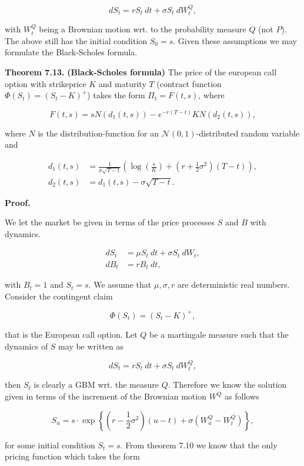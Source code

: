 \documentclass[
]{article}
\begin{document}
\[
dS_t=r S_t\ dt+\sigma S_t\ dW^Q_t,
\]

with \(W_t^Q\) being a Brownian motion wrt. to the probability measure
\(Q\) (not \(P\)). The above still has the initial condition \(S_0=s\).
Given these assumptions we may formulate the Black-Scholes formula.

\textbf{Theorem 7.13.} \textbf{(Black-Scholes formula)} The price of the
european call option with strikeprice \(K\) and maturity \(T\) (contract
function \(\Phi(S_t)=\left( S_t - K\right)^+\)) takes the form
\(\Pi_t=F(t,s)\), where

\[
F(t,s)=s N(d_1(t,s))-e^{-r(T-t)}KN(d_2(t,s)),\tag{7.52}
\]

where \(N\) is the distribution-function for an
\(\mathcal{N}(0,1)\)-distributed random variable and

\begin{align*}
d_1(t,s)&=\frac{1}{\sigma \sqrt{T-t}}\left(\log\left(\frac{s}{K}\right)+\left(r+\frac{1}{2}\sigma^2\right)(T-t)\right),\tag{7.53}\\
d_2(t,s)&=d_1(t,s)-\sigma\sqrt{T-t}.\tag{7.54}
\end{align*}

\textbf{Proof.}

We let the market be given in terms of the price processes \(S\) and
\(B\) with dynamics.

\begin{align*}
dS_t&=\mu S_t\ dt+\sigma S_t\ dW_t,\\
dB_t&=r B_t\ dt,
\end{align*}

with \(B_t=1\) and \(S_t=s\). We assume that \(\mu,\sigma, r\) are
deterministic real numbers. Consider the contingent claim

\[
\Phi(S_t)=\left( S_t - K\right)^+,
\]

that is the European call option. Let \(Q\) be a martingale measure such
that the dynamics of \(S\) may be written as

\[
dS_t=r S_t\ dt+\sigma S_t\ dW^Q_t,
\]

then \(S_t\) is clearly a GBM wrt. the measure \(Q\). Therefore we know
the solution given in terms of the increment of the Brownian motion
\(W^Q\) as follows

\[
S_u=s\cdot \exp\left\{\left(r-\frac{1}{2}\sigma^2\right)(u-t)+\sigma\left(W_u^Q-W_t^Q\right)\right\},
\]

for some initial condition \(S_t=s\). From theorem 7.10 we know that the
only pricing function which takes the form
\end{document}
